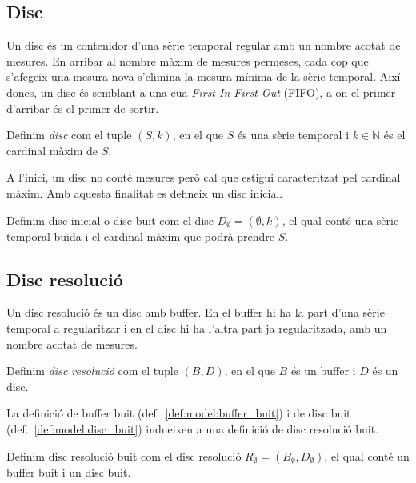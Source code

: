 \subsection{Disc}\label{sec:model:disc}

Un disc és un contenidor d'una sèrie temporal regular amb un nombre acotat de mesures. En arribar al nombre màxim de mesures permeses, cada cop que s'afegeix una mesura nova s'elimina la mesura mínima de la sèrie temporal.
Així doncs, un disc és semblant a una cua \emph{First In First Out} (FIFO), a on el primer d'arribar és el primer de sortir.  

\begin{definition}[Disc]
  Definim \emph{disc} com el tuple $(S,k)$, en el que $S$
  és una sèrie temporal i $k\in\mathbb{N}$ és el cardinal màxim de $S$.
\end{definition}

A l'inici, un disc no conté mesures però cal que estigui caracteritzat pel cardinal màxim. Amb aquesta finalitat es defineix un disc inicial.

\begin{definition}\label{def:model:disc_buit}
  Definim disc inicial o disc buit com el disc $D_{\emptyset} =
  (\emptyset,k)$, el qual conté una sèrie temporal buida i el cardinal
  màxim que podrà prendre $S$.
\end{definition}




\subsection{Disc resolució}\label{sec:model:disc_multiresolució}

Un disc resolució és un disc amb buffer. En el buffer hi ha la part d'una sèrie temporal a regularitzar i en el disc hi ha l'altra part ja regularitzada, amb un nombre acotat de mesures. 

\begin{definition}
  Definim \emph{disc resolució} com el tuple $(B,D)$, en el que $B$
  és un buffer i $D$ és un disc.
\end{definition}
 
La definició de buffer buit (def.~\ref{def:model:buffer_buit}) i de disc buit (def.~\ref{def:model:disc_buit}) indueixen a una definició de disc resolució buit. 

\begin{definition}\label{def:model:disc_resolucio_buit}
  Definim disc resolució buit com el disc resolució $R_{\emptyset}
  = (B_{\emptyset},D_{\emptyset})$, el qual conté un buffer buit i un
  disc buit.
\end{definition}




